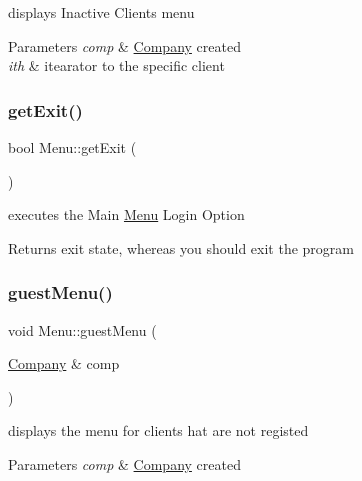 displays Inactive Clients menu 


\begin{DoxyParams}{Parameters}
{\em comp} & \hyperlink{class_company}{Company} created\\
\hline
{\em ith} & itearator to the specific client \\
\hline
\end{DoxyParams}
\hypertarget{class_menu_a0667d42e9888ba144d20b83a0855310d}{}\label{class_menu_a0667d42e9888ba144d20b83a0855310d} 
\subsubsection{\texorpdfstring{get\+Exit()}{getExit()}}
{\footnotesize\ttfamily bool Menu\+::get\+Exit (\begin{DoxyParamCaption}{ }\end{DoxyParamCaption})\hspace{0.3cm}{\ttfamily [inline]}}



executes the Main \hyperlink{class_menu}{Menu} Login Option 

\begin{DoxyReturn}{Returns}
exit state, whereas you should exit the program 
\end{DoxyReturn}
\hypertarget{class_menu_a3975fa8a4000220fed81af46ccd24da4}{}\label{class_menu_a3975fa8a4000220fed81af46ccd24da4} 
\subsubsection{\texorpdfstring{guest\+Menu()}{guestMenu()}}
{\footnotesize\ttfamily void Menu\+::guest\+Menu (\begin{DoxyParamCaption}\item[{\hyperlink{class_company}{Company} \&}]{comp }\end{DoxyParamCaption})}



displays the menu for clients hat are not registed 


\begin{DoxyParams}{Parameters}
{\em comp} & \hyperlink{class_company}{Company} created \\
\hline
\end{DoxyParams}
\hypertarget{class_menu_a6226dbafc289ffa312b537d211462ba6}{}\label{class_menu_a6226dbafc289ffa312b537d211462ba6} 
